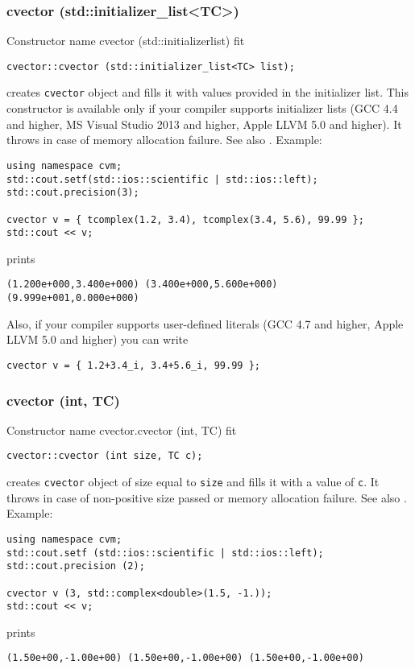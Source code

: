 \subsubsection{cvector (std::initializer\_list<TC>)}
Constructor%
\pdfdest name {cvector (std::initializerlist)} fit
\begin{verbatim}
cvector::cvector (std::initializer_list<TC> list);
\end{verbatim}
creates \verb"cvector" object and fills it with values provided in the initializer list.
This constructor is available only if your compiler supports initializer lists
(GCC 4.4 and higher, MS Visual Studio 2013 and higher, Apple LLVM 5.0 and higher).
It throws  
in case of memory allocation failure.
See also .
Example:
\begin{Verbatim}
using namespace cvm;
std::cout.setf(std::ios::scientific | std::ios::left);
std::cout.precision(3);

cvector v = { tcomplex(1.2, 3.4), tcomplex(3.4, 5.6), 99.99 };
std::cout << v;
\end{Verbatim}
prints
\begin{Verbatim}
(1.200e+000,3.400e+000) (3.400e+000,5.600e+000) (9.999e+001,0.000e+000)
\end{Verbatim}
Also, if your compiler supports user-defined literals (GCC 4.7 and higher, Apple LLVM 5.0 and higher)
you can write
\begin{Verbatim}
cvector v = { 1.2+3.4_i, 3.4+5.6_i, 99.99 };
\end{Verbatim}
\newpage




\subsubsection{cvector (int, TC)}
Constructor%
\pdfdest name {cvector.cvector (int, TC)} fit
\begin{verbatim}
cvector::cvector (int size, TC c);
\end{verbatim}
creates  \verb"cvector" object of size equal to \verb"size"
and fills it with a value of \verb"c".
It throws  
in case of non-positive size passed or memory allocation failure.
See also .
Example:
\begin{Verbatim}
using namespace cvm;
std::cout.setf (std::ios::scientific | std::ios::left);
std::cout.precision (2);

cvector v (3, std::complex<double>(1.5, -1.));
std::cout << v;
\end{Verbatim}
prints
\begin{Verbatim}
(1.50e+00,-1.00e+00) (1.50e+00,-1.00e+00) (1.50e+00,-1.00e+00)
\end{Verbatim}
\newpage




